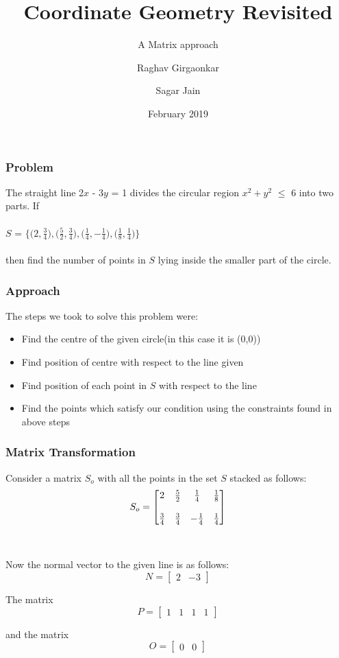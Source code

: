 \documentclass[xcolor=dvipsnames]{beamer}
\title{Coordinate Geometry Revisited}
\subtitle{A Matrix approach}
\author{Raghav Girgaonkar \and Sagar Jain}
\institute{Indian Institute of Technology Hyderabad}
\date{February 2019}
\begin{document}
 
\frame{\titlepage}
 
\begin{frame}
\frametitle{Problem}
The straight line 2$x$ - 3$y$ = 1 divides the circular region $x^{2} + y^{2}$ $\leqslant$ 6 into two parts. If\\~\\
$S$ = $\Bigg \lbrace \bigg(2,$\(\frac{3}{4}\)$\bigg),\bigg($\(\frac{5}{2}\)$,$\(\frac{3}{4}\)$\bigg),\bigg($\(\frac{1}{4}\)$,$\(-\frac{1}{4}\)$\bigg),\bigg($\(\frac{1}{8}\)$,$\(\frac{1}{4}\)$\bigg)\Bigg\rbrace$
\\~\\
then find the number of points in $S$ lying inside the smaller part of the circle.
\end{frame}

\begin{frame}
\frametitle{Approach}
The steps we took to solve this problem were:
\begin{itemize}
 \item<1-> Find the centre of the given circle(in this case it is (0,0))
 \item<2-> Find position of centre with respect to the line given
 \item<3-> Find position of each point in $S$ with respect to the line
 \item<4-> Find the points which satisfy our condition using the constraints found in above steps
\end{itemize}

\end{frame}

\begin{frame}
\frametitle{Matrix Transformation}
Consider a matrix $S_o$ with all the points in the set $S$ stacked as follows: 
\[
 S_o =
\begin{bmatrix}
    2  & $\(\frac{5}{2}\)$ & $\(\frac{1}{4}\)$ & $\(\frac{1}{8}\)$ \\~\\
    $\(\frac{3}{4}\)$ & $\(\frac{3}{4}\)$ & $\(-\frac{1}{4}\)$ &$\(\frac{1}{4}\)$\\
    
\end{bmatrix}
\]
\\~\\
Now the normal vector to the given line is as follows:
\[
 N =
\begin{bmatrix}
    2  & -3
\end{bmatrix}
\]

The matrix
\[
 P =
\begin{bmatrix}
    1 & 1 & 1 & 1
\end{bmatrix}
\]

and the matrix
\[
 O =
\begin{bmatrix}
    0  & 0
\end{bmatrix}
\]
\end{frame}
\end{document}
